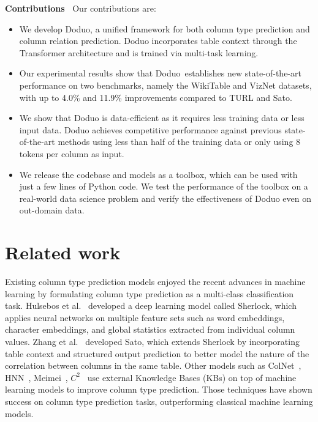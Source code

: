 \documentclass[sigconf]{acmart}
\newcommand{\name}{\mbox{\sc Doduo}}
\newcommand{\hll}[1]{#1}
\begin{document}
\smallskip
\noindent
{\bf Contributions~}
Our contributions are:
\begin{itemize}
    \setlength{\parskip}{0cm}
    \setlength{\itemsep}{0cm}
    \item We develop \name, a unified framework for both column type prediction and column relation prediction. \name{} incorporates table context through the Transformer architecture and is trained via multi-task learning. 
    \item Our experimental results show that \name\ establishes new state-of-the-art performance on two benchmarks, namely the WikiTable and VizNet datasets, with up to 4.0\% and 11.9\% improvements compared to TURL and Sato.
    \item We show that \name{} is data-efficient as it requires less training data or less input data. \name{} achieves competitive performance against previous state-of-the-art methods using less than half of the training data or only using 8 tokens per column as input. 
    \item \hll{We release the codebase and models as a toolbox, which can be used with just a few lines of Python code. We test the performance of the toolbox on a real-world data science problem and verify the effectiveness of \name{} even on out-domain data.}
\end{itemize}



\section{Related work}\label{sec:related}
Existing column type prediction models enjoyed the recent advances in machine learning by formulating column type prediction as a multi-class classification task.
%
Hulsebos et al.~\cite{Hulsebos:2019:Sherlock} developed a deep learning model called Sherlock, which applies neural networks on multiple feature sets such as word embeddings, character embeddings, and global statistics extracted from individual column values.
%
Zhang et al.~\cite{Zhang:2020:Sato} developed Sato, which extends Sherlock by incorporating table context and structured output prediction to better model the nature of the correlation between columns in the same table.
%
Other models such as ColNet~\cite{Chen:2019:AAAI:ColNet}, HNN~\cite{Chen:2019:IJCAI:HNN}, Meimei~\cite{Takeoka:2019:AAAI:Meimei}, $C^2$~\cite{Khurana:2020:SemanticAnnotation4TabularData} use external Knowledge Bases (KBs) on top of machine learning models to improve column type prediction.
%
Those techniques have shown success on column type prediction tasks, outperforming classical machine learning models.
\end{document}
